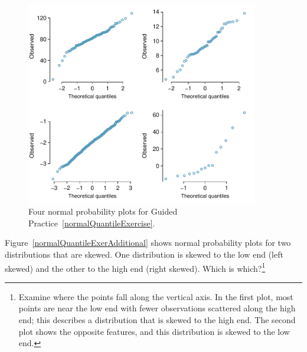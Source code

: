 \begin{figure}
\centering
\includegraphics[width=0.9\textwidth]{ch_distributions/figures/normalQuantileExer/normalQuantileExer}
\caption{Four normal probability plots for Guided Practice~\ref{normalQuantileExercise}.}
\label{normalQuantileExer}
\end{figure}


\begin{exercise} \label{normalQuantileExerciseAdditional}
Figure~\ref{normalQuantileExerAdditional} shows normal probability plots for two distributions that are skewed. One distribution is skewed to the low end (left skewed) and the other to the high end (right skewed). Which is which?\footnote{Examine where the points fall along the vertical axis. In the first plot, most points are near the low end with fewer observations scattered along the high end; this describes a distribution that is skewed to the high end. The second plot shows the opposite features, and this distribution is skewed to the low end.}
\end{exercise}

